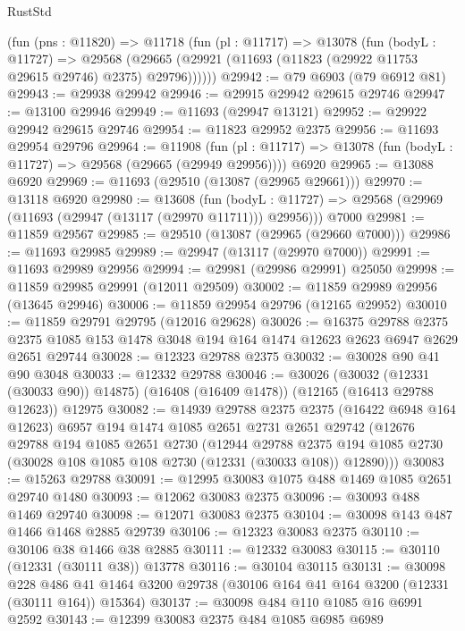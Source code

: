 \begin{lexlean}{RustStd}
\begin{coremodule}
    (fun (pns : @11820) =>
    @11718
      (fun (pl : @11717) =>
      @13078
        (fun (bodyL : @11727) =>
        @29568 (@29665 (@29921 (@11693 (@11823 (@29922 @11753 @29615 @29746) @2375) @29796))))))
@29942 := @79 @6903 (@79 @6912 @81)
@29943 := @29938 @29942
@29946 := @29915 @29942 @29615 @29746
@29947 := @13100 @29946
@29949 := @11693 (@29947 @13121)
@29952 := @29922 @29942 @29615 @29746
@29954 := @11823 @29952 @2375
@29956 := @11693 @29954 @29796
@29964 := @11908
    (fun (pl : @11717) => @13078 (fun (bodyL : @11727) => @29568 (@29665 (@29949 @29956))))
    @6920
@29965 := @13088 @6920
@29969 := @11693 (@29510 (@13087 (@29965 @29661)))
@29970 := @13118 @6920
@29980 := @13608
    (fun (bodyL : @11727) => @29568 (@29969 (@11693 (@29947 (@13117 (@29970 @11711))) @29956)))
    @7000
@29981 := @11859 @29567
@29985 := @29510 (@13087 (@29965 (@29660 @7000)))
@29986 := @11693 @29985
@29989 := @29947 (@13117 (@29970 @7000))
@29991 := @11693 @29989 @29956
@29994 := @29981 (@29986 @29991) @25050
@29998 := @11859 @29985 @29991 (@12011 @29509)
@30002 := @11859 @29989 @29956 (@13645 @29946)
@30006 := @11859 @29954 @29796 (@12165 @29952)
@30010 := @11859 @29791 @29795 (@12016 @29628)
@30026 := @16375
    @29788
    @2375
    @2375
    @1085
    @153
    @1478
    @3048
    @194
    @164
    @1474
    @12623
    @2623
    @6947
    @2629
    @2651
    @29744
@30028 := @12323 @29788 @2375
@30032 := @30028 @90 @41 @90 @3048
@30033 := @12332 @29788
@30046 := @30026
    (@30032 (@12331 (@30033 @90)) @14875)
    (@16408 (@16409 @1478))
    (@12165 (@16413 @29788 @12623))
    @12975
@30082 := @14939
    @29788
    @2375
    @2375
    (@16422 @6948 @164 @12623)
    @6957
    @194
    @1474
    @1085
    @2651
    @2731
    @2651
    @29742
    (@12676
      @29788
      @194
      @1085
      @2651
      @2730
      (@12944
        @29788
        @2375
        @194
        @1085
        @2730
        (@30028 @108 @1085 @108 @2730 (@12331 (@30033 @108)) @12890)))
@30083 := @15263 @29788
@30091 := @12995 @30083 @1075 @488 @1469 @1085 @2651 @29740 @1480
@30093 := @12062 @30083 @2375
@30096 := @30093 @488 @1469 @29740
@30098 := @12071 @30083 @2375
@30104 := @30098 @143 @487 @1466 @1468 @2885 @29739
@30106 := @12323 @30083 @2375
@30110 := @30106 @38 @1466 @38 @2885
@30111 := @12332 @30083
@30115 := @30110 (@12331 (@30111 @38)) @13778
@30116 := @30104 @30115
@30131 := @30098
    @228
    @486
    @41
    @1464
    @3200
    @29738
    (@30106 @164 @41 @164 @3200 (@12331 (@30111 @164)) @15364)
@30137 := @30098 @484 @110 @1085 @16 @6991 @2592
@30143 := @12399 @30083 @2375 @484 @1085 @6985 @6989

\end{coremodule}
\end{lexlean}
